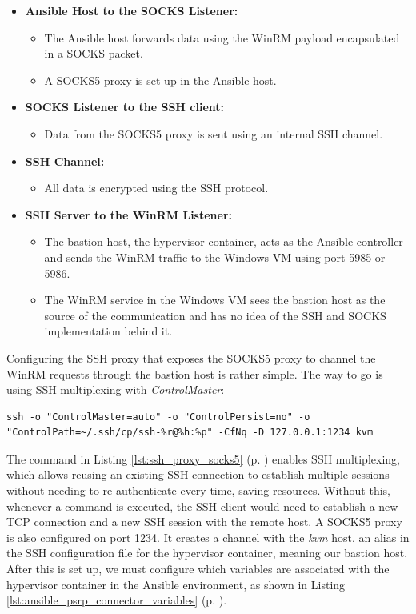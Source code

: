 \begin{itemize}
    \item \textbf{Ansible Host to the SOCKS Listener:}
        \begin{itemize}
            \item The Ansible host forwards data using the WinRM payload encapsulated in a SOCKS packet.
            \item A SOCKS5 proxy is set up in the Ansible host.
        \end{itemize}
    \item \textbf{SOCKS Listener to the SSH client:}
        \begin{itemize}
            \item Data from the SOCKS5 proxy is sent using an internal SSH channel.
        \end{itemize}
    \item \textbf{SSH Channel:}
        \begin{itemize}
            \item All data is encrypted using the SSH protocol.
        \end{itemize}
    \item \textbf{SSH Server to the WinRM Listener:}
        \begin{itemize}
            \item The bastion host, the hypervisor container, acts as the Ansible controller and sends the WinRM traffic to the Windows VM using port 5985 or 5986.
            \item The WinRM service in the Windows VM sees the bastion host as the source of the communication and has no idea of the SSH and SOCKS implementation behind it.
        \end{itemize}
\end{itemize}

Configuring the SSH proxy that exposes the SOCKS5 proxy to channel the WinRM requests through the bastion host is rather simple. The way to go is using SSH multiplexing with \textit{ControlMaster}:

\begin{lstlisting}[caption=SSH Proxy Exposing SOCKS5 Proxy.,numbers=none,label={lst:ssh_proxy_socks5}]
ssh -o "ControlMaster=auto" -o "ControlPersist=no" -o "ControlPath=~/.ssh/cp/ssh-%r@%h:%p" -CfNq -D 127.0.0.1:1234 kvm
\end{lstlisting}

The command in Listing \ref{lst:ssh_proxy_socks5} (p. \pageref{lst:ssh_proxy_socks5}) enables SSH multiplexing, which allows reusing an existing SSH connection to establish multiple sessions without needing to re-authenticate every time, saving resources. Without this, whenever a command is executed, the SSH client would need to establish a new TCP connection and a new SSH session with the remote host. A SOCKS5 proxy is also configured on port 1234. It creates a channel with the \textit{kvm} host, an alias in the SSH configuration file for the hypervisor container, meaning our bastion host. After this is set up, we must configure which variables are associated with the hypervisor container in the Ansible environment, as shown in Listing \ref{lst:ansible_psrp_connector_variables} (p. \pageref{lst:ansible_psrp_connector_variables}).

